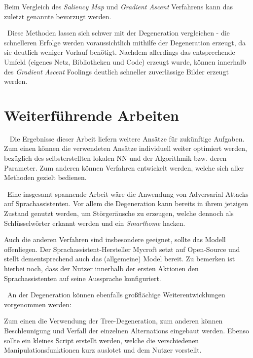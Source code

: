 Beim Vergleich des \textit{Saliency Map} und \textit{Gradient Ascent} Verfahrens kann das zuletzt genannte bevorzugt werden. 

~\newline Diese Methoden lassen sich schwer mit der Degeneration vergleichen - die schnelleren Erfolge werden voraussichtlich mithilfe der Degeneration erzeugt, da sie deutlich weniger Vorlauf benötigt.
Nachdem allerdings das entsprechende Umfeld (eigenes Netz, Bibliotheken und Code) erzeugt wurde, können innerhalb des \textit{Gradient Ascent} Foolings deutlich schneller zuverlässige Bilder erzeugt werden.  



\section{Weiterführende Arbeiten}~\newline 
Die Ergebnisse dieser Arbeit liefern weitere Ansätze für zukünftige Aufgaben. Zum einen können die verwendeten Ansätze individuell weiter optimiert werden, bezüglich des selbsterstellten lokalen \acl{NN} und der Algorithmik bzw. deren Parameter. Zum anderen können Verfahren entwickelt werden, welche sich aller Methoden gezielt bedienen. 


~\newline Eine insgesamt spannende Arbeit wäre die Anwendung von Adversarial Attacks auf Sprachassistenten. 
Vor allem die Degeneration kann bereits in ihrem jetzigen Zustand genutzt werden, um Störgeräusche zu erzeugen, welche dennoch als Schlüsselwörter erkannt werden und ein \textit{Smarthome} hacken. 

Auch die anderen Verfahren sind insbesondere geeignet, sollte das Modell offenliegen. Der Sprachassistent-Hersteller Mycroft setzt auf Open-Source und stellt dementsprechend auch das (allgemeine) Model bereit. 
Zu bemerken ist hierbei noch, dass der Nutzer innerhalb der ersten Aktionen den Sprachassistenten auf seine Aussprache konfiguriert.  

~\newline An der Degeneration können ebenfalls großflächige Weiterentwicklungen vorgenommen werden: 

Zum einen die Verwendung der Tree-Degeneration, zum anderen können Beschleunigung und Verfall der einzelnen Alternations eingebaut werden. Ebenso sollte ein kleines Script erstellt werden, welche die verschiedenen Manipulationsfunktionen kurz auslotet und dem Nutzer vorstellt. 

